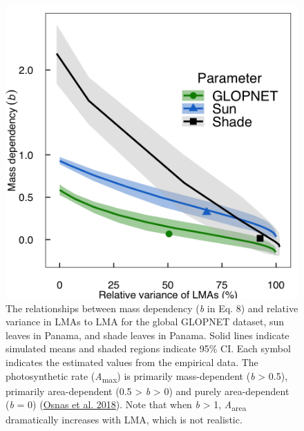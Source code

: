 \documentclass[
  12pt,
]{article}
\begin{document}
\begin{figure}
\hypertarget{fig:massplt}{%
\centering
\includegraphics{../figs/mass_prop_simple.png}
\caption{The relationships between mass dependency (\emph{b} in Eq. 8) and relative variance in LMAs to LMA for the global GLOPNET dataset, sun leaves in Panama, and shade leaves in Panama.
Solid lines indicate simulated means and shaded regions indicate 95\% CI.
Each symbol indicates the estimated values from the empirical data.
The photosynthetic rate (\emph{A}\textsubscript{max}) is primarily mass-dependent (\emph{b} \textgreater{} 0.5), primarily area-dependent (0.5 \textgreater{} \emph{b} \textgreater{} 0) and purely area-dependent (\emph{b} = 0) (\protect\hyperlink{ref-Osnas2018}{Osnas et al. 2018}).
Note that when \emph{b} \textgreater{} 1, \emph{A}\textsubscript{area} dramatically increases with LMA, which is not realistic.}\label{fig:massplt}
}
\end{figure}

\newpage
\end{document}
